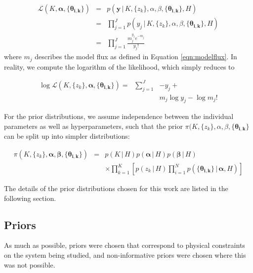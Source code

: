 \documentclass[12pt]{emulateapj}
\newcommand{\given}{\,|\,}
\newcommand{\counts}{y}
\newcommand{\pars}{\theta}
\newcommand{\mean}{m}
\newcommand{\likelihood}{{\mathcal L}}
\begin{document}
\begin{eqnarray}
\likelihood(K, \bm{\alpha}, \{\bm{\pars_{i,k}}\}) & = & p(\bm{\counts} \given K, \{z_k\}, \alpha, \beta, \{\bm{\pars_{i,k}}\}, H) \\ \nonumber
			& = & \prod_{j=1}^{J}{p(\counts_j \given K, \{z_k\}, \alpha, \beta, \{\bm{\pars_{i,k}}\}, H)} \\\nonumber
			& = &  \prod_{j=1}^{J} \frac{ \mean_j^{\counts_j} e^{-\mean_j}}{\counts_j !} 
\end{eqnarray}	
\noindent where $\mean_j$ describes the model flux as defined in Equation \ref{eqn:modelflux}. In reality, we compute the logarithm of the likelihood, which simply reduces to

\begin{eqnarray}
\log{\likelihood(K, \{z_k\}, \bm{\alpha}, \{\bm{\pars_{i,k}}\})} = & \sum_{j=1}^{J} & -\counts_j + \\ \nonumber 
					    & & \mean_j \log{\counts_j} - \log{\mean_j !} %
\end{eqnarray}

For the prior distributions, we assume independence between the individual parameters as well as hyperparameters, such that the 
prior  $\pi(K, \{z_k\}, \alpha, \beta, \{\bm{\pars_{i,k}}\} $ can be split up into simpler distributions:

\begin{eqnarray}
\pi(K, \{z_k\}, \bm{\alpha}, \bm{\beta}, \{\bm{\pars_{i,k}}\} ) & = &  p(K \given H) p(\bm{\alpha} \given H) p(\bm{\beta} \given H)  \\	
					& & \times \prod_{k=1}^{K}{\left[p(z_k \given H) \prod_{i=1}^{N}{p( \{\bm{\pars_{i,k}}\} \given \bm{\alpha}, H)}\right]} \nonumber
\end{eqnarray}

The details of the prior distributions chosen for this work are listed in the following section.

\subsection{Priors}
\label{sec:priors}

As much as possible, priors were chosen that correspond to physical constraints on the system being studied, and non-informative priors were chosen where this was not possible. 
\end{document}
